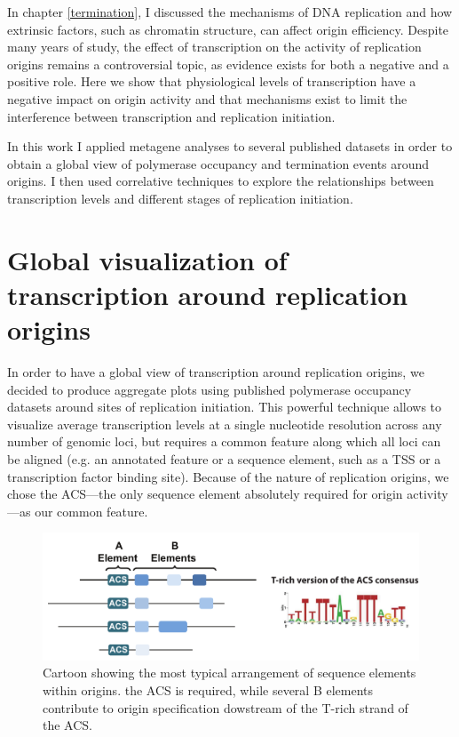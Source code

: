 

In chapter \ref{termination}, I discussed the mechanisms of DNA replication and how extrinsic factors, such as chromatin structure, can affect origin efficiency. Despite many years of study, the effect of transcription on the activity of replication origins remains a controversial topic, as evidence exists for both a negative and a positive role. 
Here we show that physiological levels of transcription have a negative impact on origin activity and that mechanisms exist to limit the interference between transcription and replication initiation.

In this work I applied metagene analyses to several published datasets in order to obtain a global view of polymerase occupancy and termination events around origins. I then used correlative techniques to explore the relationships between transcription levels and different stages of replication initiation. 

\singlespacing
\section{Global visualization of transcription around replication origins}
\doublespacing

In order to have a global view of transcription around replication origins, we decided to produce aggregate plots using published polymerase occupancy datasets \cite{schaughency:2014:genomewide} around sites of replication initiation. This powerful technique allows to visualize average transcription levels at a single nucleotide resolution across any number of genomic loci, but requires a common feature along which all loci can be aligned (e.g. an annotated feature or a sequence element, such as a TSS or a transcription factor binding site). Because of the nature of replication origins, we chose the ACS—the only sequence element absolutely required for origin activity—as our common feature. 

\begin{figure}[ht]

\centering
\includegraphics[width=\textwidth]{figures/results/acs}
\caption[ACS consensus and arrangement relative to other origin DNA elements]{Cartoon showing the most typical arrangement of sequence elements within origins. the ACS is required, while several B elements contribute to origin specification dowstream of the T-rich strand of the ACS.}
\label{fig:originSchema}

\end{figure}

